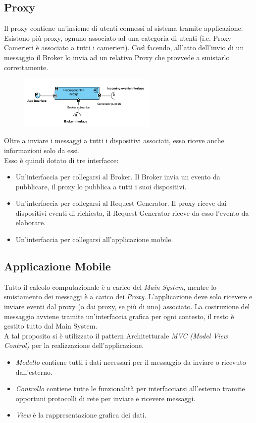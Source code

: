 \subsection{Proxy}
Il proxy contiene un'insieme di utenti connessi al sistema tramite applicazione. Esistono più proxy, ognuno associato ad una categoria di utenti (i.e. Proxy Camerieri è associato a tutti i camerieri). Così facendo, all'atto dell'invio di un messaggio il Broker lo invia ad un relativo Proxy che provvede a smistarlo correttamente. 
\begin{figure}[H]
	\centering
	\includegraphics[width=0.6\textwidth]{Immagini/proxy.png}
\end{figure}
Oltre a inviare i messaggi a tutti i dispositivi associati, esso riceve anche informazioni solo da essi.
\\Esso è quindi dotato di tre interfacce:
\begin{itemize}
	\item Un'interfaccia per collegarsi al Broker. Il Broker invia un evento da pubblicare, il proxy lo pubblica a tutti i suoi dispositivi.
	\item Un'interfaccia per collegarsi al Request Generator. Il proxy riceve dai dispositivi eventi di richiesta, il Request Generator riceve da esso l'evento da elaborare.
	\item Un'interfaccia per collegarsi all'applicazione mobile.
\end{itemize}

\subsection{Applicazione Mobile}
Tutto il calcolo computazionale è a carico del \textit{Main System}, mentre lo smistamento dei messaggi è a carico dei \textit{Proxy}. L'applicazione deve solo ricevere e inviare eventi dal proxy (o dai proxy, se più di uno) associato. La costruzione del messaggio avviene tramite un'interfaccia grafica per ogni contesto, il resto è gestito tutto dal Main System.
\\A tal proposito si è utilizzato il pattern Architetturale \textit{MVC (Model View Control)} per la realizzazione dell'applicazione.
\begin{itemize}
	\item \textit{Modello} contiene tutti i dati necessari per il messaggio da inviare o ricevuto dall'esterno.
	\item \textit{Controllo} contiene tutte le funzionalità per interfacciarsi all'esterno tramite opportuni protocolli di rete per inviare e ricevere messaggi.
	\item \textit{View} è la rappresentazione grafica dei dati.
\end{itemize}



